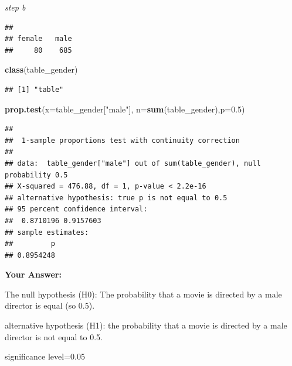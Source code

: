 \documentclass[
]{article}
\newenvironment{Shaded}{\begin{snugshade}}{\end{snugshade}}
\newcommand{\AttributeTok}[1]{\textcolor[rgb]{0.13,0.29,0.53}{#1}}
\newcommand{\CommentTok}[1]{\textcolor[rgb]{0.56,0.35,0.01}{\textit{#1}}}
\newcommand{\FloatTok}[1]{\textcolor[rgb]{0.00,0.00,0.81}{#1}}
\newcommand{\FunctionTok}[1]{\textcolor[rgb]{0.13,0.29,0.53}{\textbf{#1}}}
\newcommand{\NormalTok}[1]{#1}
\newcommand{\OtherTok}[1]{\textcolor[rgb]{0.56,0.35,0.01}{#1}}
\newcommand{\SpecialCharTok}[1]{\textcolor[rgb]{0.81,0.36,0.00}{\textbf{#1}}}
\newcommand{\StringTok}[1]{\textcolor[rgb]{0.31,0.60,0.02}{#1}}
\begin{document}
\emph{step b}

\begin{Shaded}
\end{Shaded}

\begin{verbatim}
## 
## female   male 
##     80    685
\end{verbatim}

\begin{Shaded}
\begin{Highlighting}[]
\FunctionTok{class}\NormalTok{(table\_gender)}
\end{Highlighting}
\end{Shaded}

\begin{verbatim}
## [1] "table"
\end{verbatim}

\begin{Shaded}
\begin{Highlighting}[]
\FunctionTok{prop.test}\NormalTok{(}\AttributeTok{x=}\NormalTok{table\_gender[}\StringTok{"male"}\NormalTok{], }\AttributeTok{n=}\FunctionTok{sum}\NormalTok{(table\_gender),}\AttributeTok{p=}\FloatTok{0.5}\NormalTok{)}
\end{Highlighting}
\end{Shaded}

\begin{verbatim}
## 
##  1-sample proportions test with continuity correction
## 
## data:  table_gender["male"] out of sum(table_gender), null probability 0.5
## X-squared = 476.88, df = 1, p-value < 2.2e-16
## alternative hypothesis: true p is not equal to 0.5
## 95 percent confidence interval:
##  0.8710196 0.9157603
## sample estimates:
##         p 
## 0.8954248
\end{verbatim}

\textbf{Your Answer:}

The null hypothesis (H0): The probability that a movie is directed by a
male director is equal (so 0.5).

alternative hypothesis (H1): the probability that a movie is directed by
a male director is not equal to 0.5.

significance level=0.05
\end{document}

